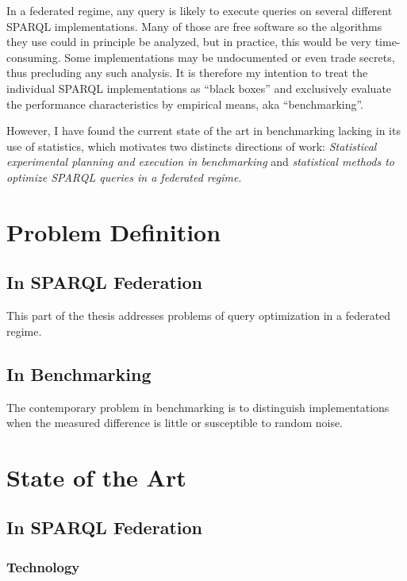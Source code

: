 \documentclass{llncs}
\begin{document}
In a federated regime, any query is likely to execute queries on
several different SPARQL implementations. Many of those are free
software so the algorithms they use could in principle be analyzed,
but in practice, this would be very time-consuming. Some
implementations may be undocumented or even trade secrets, thus
precluding any such analysis. It is therefore my intention to treat
the individual SPARQL implementations as ``black boxes'' and
exclusively evaluate the performance characteristics by empirical
means, aka ``benchmarking''.

However, I have found the current state of the art in benchmarking
lacking in its use of statistics, which motivates two distincts
directions of work: \emph{Statistical experimental planning and execution in
benchmarking} and \emph{statistical methods to optimize SPARQL queries
in a federated regime}.

\section{Problem Definition}

\subsection{In SPARQL Federation}

This part of the thesis addresses problems of query optimization in a
federated regime.

\subsection{In Benchmarking}

The contemporary problem in benchmarking is to distinguish
implementations when the measured difference is little or susceptible
to random noise.

\section{State of the Art}

\subsection{In SPARQL Federation}

\subsubsection{Technology}
\end{document}
